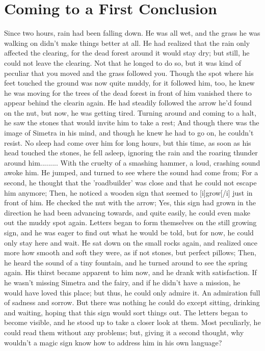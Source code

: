 \chapter{Coming to a First Conclusion}
\label{cha:coming-first-concl}
Since two hours, rain had been falling down. 
He was all wet, and the grass he was walking on didn't make things better at all. He had realized that the rain only affected the clearing, for the dead forest around it would stay dry; but still, he could not leave the clearing. Not that he longed to do so, but it was kind of peculiar that you moved and the grass followed you. Though the spot where his feet touched the ground was now quite muddy, for it followed him, too, he knew he was moving for the trees of the dead forest in front of him vanished there to appear behind the clearin again. 
He had steadily followed the arrow he'd found on the nut, but now, he was getting tired. Turning around and coming to a halt, he saw the stones that would invite him to take a rest; And though there was the image of Simetra in his mind, and though he knew he had to go on, he couldn't resist. No sleep had come over him for long hours, but this time, as soon as his head touched the stones, he fell asleep, ignoring the rain and the roaring thunder around him......... 
With the cruelty of a smashing hammer, a loud, crashing sound awoke him. 
He jumped, and turned to see where the sound had come from; For a second, he thought that the 'roadbuilder' was close and that he could not escape him anymore; Then, he noticed a wooden sign that seemed to [i]grow[/i] just in front of him. He checked the nut with the arrow; Yes, this sign had grown in the direction he had been advancing towards, and quite easily, he could even make out the muddy spot again. 
Letters began to form themselves on the still growing sign, and he was eager to find out what he would be told, but for now, he could only stay here and wait. 
He sat down on the small rocks again, and realized once more how smooth and soft they were, as if not stones, but perfect pillows; Then, he heard the sound of a tiny fountain, and he turned around to see the spring again. His thirst became apparent to him now, and he drank with satisfaction. 
If he wasn't missing Simetra and the fairy, and if he didn't have a mission, he would have loved this place; but thus, he could only admire it. 
An admiration full of sadness and sorrow. 
But there was nothing he could do except sitting, drinking and waiting, hoping that this sign would sort things out. 
The letters began to become visible, and he stood up to take a closer look at them. Most peculiarly, he could read them without any problems; but, giving it a second thought, why wouldn't a magic sign know how to address him in his own language? 

